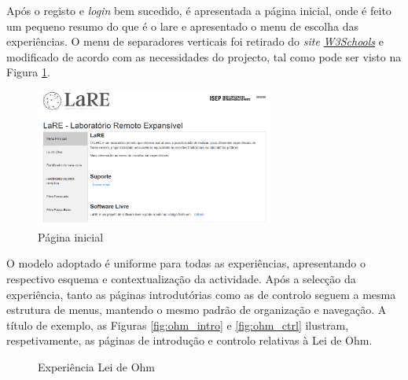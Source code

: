 Após o registo e \textit{login} bem sucedido, é apresentada a página inicial, onde é feito um pequeno resumo do que é o \acrshort{lare} e apresentado o menu de escolha das experiências. O menu de separadores verticais foi retirado do \textit{site} \href{https://www.w3schools.com/howto/howto_js_vertical_tabs.asp}{\textit{W3Schools}} e modificado de acordo com as necessidades do projecto, tal como pode ser visto na Figura \ref{fig:pagmenu}.

\begin{figure}[hbtp]
	\centering
	\includegraphics[width=0.7\textwidth]{figures/menupage.png}
	\caption{Página inicial}
	\label{fig:pagmenu}
\end{figure}

O modelo adoptado é uniforme para todas as experiências, apresentando o respectivo esquema e contextualização da actividade. Após a selecção da experiência, tanto as páginas introdutórias como as de controlo seguem a mesma estrutura de menus, mantendo o mesmo padrão de organização e navegação. A título de exemplo, as Figuras \ref{fig:ohm_intro} e \ref{fig:ohm_ctrl} ilustram, respetivamente, as páginas de introdução e controlo relativas à Lei de Ohm. 


\begin{figure}[hbtp]
	\centering%
		\centering
		\qquad
		\caption{ Experiência Lei de Ohm}%
		\label{fig:pagohm}%
	\end{figure}

